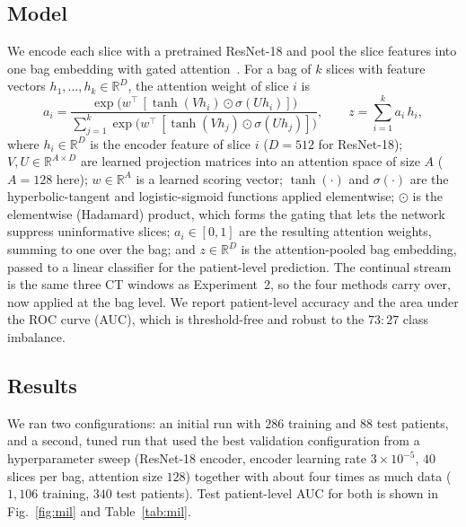 \documentclass[11pt]{article}
\begin{document}
\subsection{Model}
We encode each slice with a pretrained ResNet-18 and pool the slice features into
one bag embedding with gated attention~\cite{ilse2018mil}. For a bag of $k$
slices with feature vectors $h_1,\dots,h_k\in\mathbb{R}^{D}$, the attention
weight of slice $i$ is
\begin{equation}
a_i=\frac{\exp\!\big(w^{\top}\,[\tanh(V h_i)\odot\sigma(U h_i)]\big)}
        {\sum_{j=1}^{k}\exp\!\big(w^{\top}\,[\tanh(V h_j)\odot\sigma(U h_j)]\big)},
\qquad
z=\sum_{i=1}^{k} a_i\,h_i ,
\label{eq:mil}
\end{equation}
where $h_i\in\mathbb{R}^{D}$ is the encoder feature of slice $i$ ($D{=}512$ for
ResNet-18); $V,U\in\mathbb{R}^{A\times D}$ are learned projection matrices into an
attention space of size $A$ ($A{=}128$ here); $w\in\mathbb{R}^{A}$ is a learned
scoring vector; $\tanh(\cdot)$ and $\sigma(\cdot)$ are the hyperbolic-tangent and
logistic-sigmoid functions applied elementwise; $\odot$ is the elementwise
(Hadamard) product, which forms the gating that lets the network suppress
uninformative slices; $a_i\in[0,1]$ are the resulting attention weights, summing
to one over the bag; and $z\in\mathbb{R}^{D}$ is the attention-pooled bag
embedding, passed to a linear classifier for the patient-level prediction. The
continual stream is the same three CT windows as Experiment~2, so the four
methods carry over, now applied at the bag level. We report patient-level
accuracy and the area under the ROC curve (AUC), which is threshold-free and
robust to the $73{:}27$ class imbalance.

\subsection{Results}
We ran two configurations: an initial run with $286$ training and $88$ test
patients, and a second, tuned run that used the best validation configuration
from a hyperparameter sweep (ResNet-18 encoder, encoder learning rate
$3\times10^{-5}$, $40$ slices per bag, attention size $128$) together with about
four times as much data ($1{,}106$ training, $340$ test patients). Test
patient-level AUC for both is shown in Fig.~\ref{fig:mil} and
Table~\ref{tab:mil}.
\end{document}
